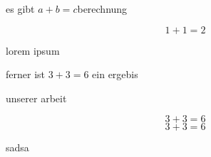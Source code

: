 


\label{0}


es gibt {$a+b=c$}berechnung
\begin{myquote}
\item{} \begin{equation*}1+1=2\end{equation*}
\end{myquote}

lorem ipsum 
\begin{myquote}
\item{} ferner ist {$3+3=6$} ein ergebis
\end{myquote}

unserer arbeit
\begin{myquote}
\item{} \begin{equation*}3+3=6\end{equation*}\begin{equation*}3+3=6\end{equation*}
\end{myquote}

sadsa




